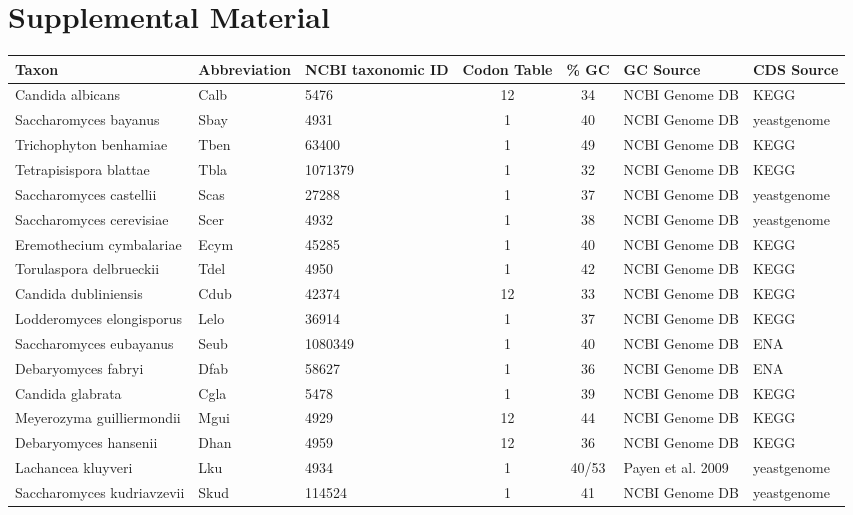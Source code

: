 \documentclass[12pt]{article}
\begin{document}
\section*{Supplemental Material}
\begin{table}
\begin{tabular}{ | l | l | l | c | c | l | l | }
\hline
	Taxon 				& Abbreviation 	& NCBI taxonomic ID 	& Codon Table	& \% GC & GC Source  		& CDS Source \\ \hline
	Candida albicans 		& Calb 		& 5476 			&	12	& 34 	& NCBI Genome DB 	& KEGG \\ \hline
	Saccharomyces bayanus 		& Sbay 		& 4931 			&	1	& 40 	& NCBI Genome DB 	& yeastgenome \\ \hline
	Trichophyton benhamiae 		& Tben		& 63400 		&	1	& 49 	& NCBI Genome DB 	& KEGG \\ \hline
	Tetrapisispora blattae 		& Tbla 		& 1071379 		&	1	& 32 	& NCBI Genome DB 	& KEGG \\ \hline
	Saccharomyces castellii 	& Scas 		& 27288 		&	1	& 37 	& NCBI Genome DB 	& yeastgenome \\ \hline
	Saccharomyces cerevisiae 	& Scer 		& 4932 			&	1	& 38 	& NCBI Genome DB 	& yeastgenome \\ \hline
	Eremothecium cymbalariae 	& Ecym 		& 45285 		&	1	& 40 	& NCBI Genome DB 	& KEGG \\ \hline
	Torulaspora delbrueckii 	& Tdel 		& 4950 			&	1	& 42 	& NCBI Genome DB 	& KEGG \\ \hline
	Candida dubliniensis 		& Cdub 		& 42374 		&	12	& 33 	& NCBI Genome DB 	& KEGG \\ \hline
	Lodderomyces elongisporus 	& Lelo 		& 36914 		&	1	& 37 	& NCBI Genome DB 	& KEGG \\ \hline
	Saccharomyces eubayanus 	& Seub 		& 1080349 		&	1	& 40 	& NCBI Genome DB 	& ENA \\ \hline
	Debaryomyces fabryi 		& Dfab 		& 58627 		&	1	& 36 	& NCBI Genome DB 	& ENA \\ \hline
	Candida glabrata 		& Cgla 		& 5478 			&	1	& 39 	& NCBI Genome DB 	& KEGG \\ \hline
	Meyerozyma guilliermondii 	& Mgui 		& 4929 			&	12	& 44 	& NCBI Genome DB 	& KEGG \\ \hline
	Debaryomyces hansenii 		& Dhan 		& 4959 			&	12	& 36 	& NCBI Genome DB 	& KEGG \\ \hline
	Lachancea kluyveri 		& Lku 		& 4934 			&	1	& 40/53 & Payen et al. 2009 	& yeastgenome \\ \hline
	Saccharomyces kudriavzevii 	& Skud 		& 114524 		&	1	& 41 	& NCBI Genome DB 	& yeastgenome \\ \hline

\end{tabular}
\end{table}
\end{document}
